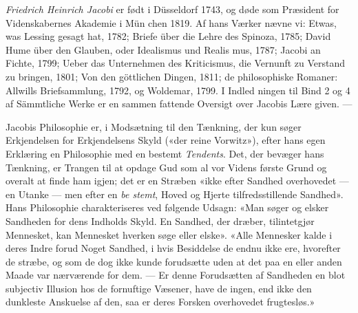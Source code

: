 \documentclass[12pt,a4paper]{book}
\begin{document}
\emph{Friedrich Heinrich Jacobi} er født i Düsseldorf 1743,
og døde som Præsident for Videnskabernes Akademie i Mün\-%
chen 1819. Af hans Værker nævne vi: Etwas, was Lessing
gesagt hat, 1782; Briefe über die Lehre des Spinoza, 1785;
David Hume über den Glauben, oder Idealismus und Realis\-%
mus, 1787; Jacobi an Fichte, 1799; Ueber das Unternehmen
des Kriticismus, die Vernunft zu Verstand zu bringen, 1801;
Von den göttlichen Dingen, 1811; de philosophiske Romaner:
Allwills Briefsammlung, 1792, og Woldemar, 1799. I Indled\-%
ningen til Bind 2 og 4 af Sämmtliche Werke er en sammen\-%
fattende Oversigt over Jacobis Lære given. ---

Jacobis Philosophie er, i Modsætning til den Tænkning,
der kun søger Erkjendelsen for Erkjendelsens Skyld («der reine
Vorwitz»), efter hans egen Erklæring en Philosophie med en
bestemt \emph{Tendents}. Det, der bevæger hans Tænkning, er
Trangen til at opdage Gud som al vor Videns første Grund
og overalt at finde ham igjen; det er en Stræben «ikke efter
Sandhed overhovedet --- en Utanke --- men efter en \emph{be\-%
stemt}, Hoved og Hjerte tilfredsstillende Sandhed». Hans
Philosophie charakteriseres ved følgende Udsagn: «Man søger
og elsker Sandheden for dens Indholds Skyld. En Sandhed,
der dræber, tilintetgjør Mennesket, kan Mennesket hverken
søge eller elske». «Alle Mennesker kalde i deres Indre forud
Noget Sandhed, i hvis Besiddelse de endnu ikke ere, hvorefter
de stræbe, og som de dog ikke kunde forudsætte uden at det
paa en eller anden Maade var nærværende for dem. --- Er
denne Forudsætten af Sandheden en blot subjectiv Illusion hos
de fornuftige Væsener, have de ingen, end ikke den dunkleste
Anskuelse af den, saa er deres Forsken overhovedet frugtesløs.»
\end{document}

